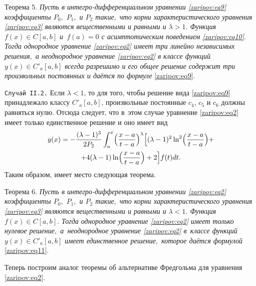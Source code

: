 \smallskip

{\small \sc Теорема 5.} {\it Пусть в интегро-дифференциальном уравнении \eqref{zaripov:eq9} коэффициенты $P_0,$ $P_1,$  и $P_2$  такие$,$ что корни характеристического уравнения \eqref{zaripov:eq3} являются вещественными и равными и $\lambda>1.$ 
Функция $f(x)\in C[a,b]$   и~${f(a)=0}$ с асимптотическим поведением \eqref{zaripov:eq10}$.$	
 Тогда однородное уравнение \eqref{zaripov:eq2} имеет три линейно независимых решения$,$ а неоднородное уравнение \eqref{zaripov:eq2} в классе функций $y(x)\in  C'_a[a,b]$ всегда разрешимо и его общее решение содержит три произвольных постоянных и даётся по формуле} \eqref{zaripov:eq9}.

\smallskip

\texttt{Случай II.2.} 
Если $\lambda<1$, то для того, чтобы решение вида \eqref{zaripov:eq9} принадлежало классу $ C'_a[a,b] $, произвольные постоянные $c_4$, $c_5$ и $c_6$  должны равняться нулю. 
Отсюда следует, что в~этом случае уравнение \eqref{zaripov:eq2} имеет только единственное решение и оно имеет вид
 \begin{multline}
y(x)=-\frac{(\lambda-1)^3}{2P_2}\int _{a}^{x} 
\Bigl(\frac{x-a}{t-a}\Bigr)^\lambda
\Bigl[(\lambda-1)^2\ln^2\Bigl(\frac{x-a}{t-a}\Bigr)+\\
+4(\lambda-1)\ln\Bigl(\frac{x-a}{t-a}\Bigr)+2\Bigr]f(t)dt.\label{zaripov:eq11}
\end{multline}
Таким образом, имеет место следующая теорема.

\smallskip

{\small \sc Теорема 6.} {\it Пусть в интегро-дифференциальном уравнении \eqref{zaripov:eq2} коэффициенты $P_0,$ $P_1,$  и $P_2$  такие$,$ что корни характеристического уравнения \eqref{zaripov:eq3} являются вещественными и равными и $\lambda<1.$ Функция $f(x)\in C[a,b].$
Тог\-да однородное уравнение \eqref{zaripov:eq2} имеет только нулевое решение$,$ а~неоднородное уравнение \eqref{zaripov:eq2} в~классе функций $y(x)\in C'_a[a,b]$ имеет единственное решение$,$ которое даётся формулой} \eqref{zaripov:eq11}.
 
 \smallskip

	Теперь построим аналог теоремы об альтернативе Фредгольма для уравнения \eqref{zaripov:eq2}.

 \smallskip

